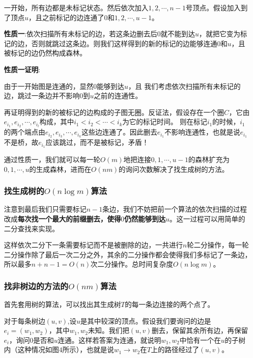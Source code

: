 \documentclass{noithesis}
\begin{document}
一开始，所有边都是未标记状态。然后依次加入$1, 2, \cdots, n - 1$号顶点。假设加入到了顶点$u$，且之前标记的边连通了$0$和$1, 2, \cdots, u - 1$。


\textbf{性质一}:依次扫描所有未标记的边，若这条边删去后$0$就不能到达$u$，就把它变为标记的边，否则就跳过这条边。则我们这样得到的新的标记的边能够连通$0$和$u$，且被标记的边仍然构成森林。

\textbf{性质一证明}:

由于一开始图是连通的，显然$0$能够到达$u$，且
我们考虑依次扫描所有未标记的边，跳过一条边并不影响$0$到$u$之前的连通性。

再证明得到的新的被标记的边构成的子图无圈。反证法，假设存在一个圈$C$，它由$e_{i_1}, e_{i_2}, \cdots, e_{i_l}$构成，其中$i_1 < i_2 < \cdots < i_k$为它的标记时间。
则在标记$i_1$的时候，$i_1$的两个端点由$e_{i_2}, e_{i_3}, \cdots, e_{i_k}$这些边连通了。因此删去$e_{i_1}$不影响连通性，也就是说$e_{i_1}$不是桥，故$e_{i_1}$应该跳过，而不是被标记，矛盾！



通过性质一，我们就可以每一轮$O(m)$地把连接$0, 1, \cdots, u - 1$的森林扩充为$0, 1, \cdots, u$的生成森林，进而在$O(nm)$的询问次数解决了找生成树的方法。

\subsubsection{找生成树的$O(n \log m)$算法}

注意到最后我们只需要标记$n - 1$条边，我们不妨把前一个算法的依次扫描的过程改成\textbf{每次找一个最大的前缀删去，使得$0$仍然能够到达$u$}。这一过程可以用简单的二分查找来实现。

这样依次二分下一条需要标记而不是被删除的边，一共进行$n$轮二分操作，每一轮二分操作除了最后一次二分之外，其余的二分操作都会使得我们多标记了一条边，所以最多$n + n - 1 = O(n)$次二分操作。总时间复杂度$O(n \log m)$。

\subsubsection{找非树边的方法的$O(nm)$算法}

首先套用树的算法，可以找出其生成树$T$的每一条边连接的两个点了。

对于每条树边$(u, v)$,设$u$是其中较深的顶点。假设我们要询问的边是$e_i = (w_1, w_2)$，其中$w_1, w_2$未知。我们把$(u, v)$删去，保留其余所有边，再保留$e_i$，询问$0$是否和$u$连通。这样若答案为连通，就说明$w_1, w_2$中恰有一个在$u$的子树内（这种情况如图$4$所示），也就是说$w_1 \rightarrow w_2$在$T$上的路径经过了$(u, v)$。
\end{document}
